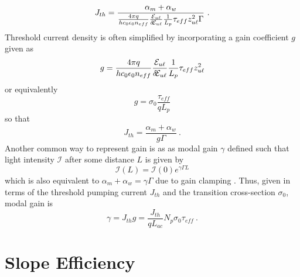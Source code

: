 \documentclass[12pt]{report}
\begin{document}
{\begin{equation}
J_{th} = \frac{\alpha_m + \alpha_w}{\frac{4 \pi q}{h c_0 \epsilon_0 n_{eff}} \frac{\EE_{u\ell}}{\delta\!\EE_{u\ell}} \frac{1}{L_p} \tau_{eff} z_{u\ell}^2 \Gamma} {~.}
\end{equation}
Threshold current density is often simplified by incorporating a gain coefficient $g$  given as
\begin{equation}
g = \frac{4 \pi q}{h c_0 \epsilon_0 n_{eff}} \frac{\EE_{u\ell}}{\delta\!\EE_{u\ell}} \frac{1}{L_p} \tau_{eff} z_{u\ell}^2
\end{equation}
or equivalently
\begin{equation}
g = \sigma_0 \frac{\tau_{eff}}{q L_p}
\end{equation}
so that
\begin{equation}
J_{th} = \frac{\alpha_m + \alpha_w}{g \Gamma} {~.}
\end{equation}
Another common way to represent gain is as as modal gain $\gamma$  defined such that light intensity $\mathcal{I}$ after some distance $L$ is given by
\begin{equation}
\mathcal{I}(L) = \mathcal{I}(0) e^{\gamma \Gamma L}
\end{equation}
which is also equivalent to $\alpha_m+\alpha_w=\gamma \Gamma$ due to gain clamping \cite{SalehTeich:book:1991}.  Thus, given in terms of the threshold pumping current $J_{th}$ and the transition cross-section $\sigma_0$, modal gain is
\begin{equation}
\gamma = J_{th} g = \frac{J_{th}}{q L_{ac}} N_p \sigma_0 \tau_{eff} {~.}
\end{equation}



\section{Slope Efficiency}

}
\end{document}
